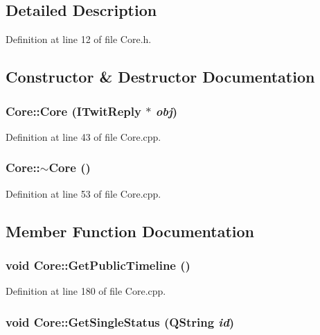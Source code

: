 \subsection{Detailed Description}


Definition at line 12 of file Core.h.

\subsection{Constructor \& Destructor Documentation}
\hypertarget{classCore_4d99e39664e6f9a1b885742f92d83ade}{
\subsubsection{\setlength{\rightskip}{0pt plus 5cm}Core::Core ({\bf ITwitReply} $\ast$ {\em obj})}}
\label{classCore_4d99e39664e6f9a1b885742f92d83ade}




Definition at line 43 of file Core.cpp.\hypertarget{classCore_776f8c46504b14183883c6273f93eaed}{
\subsubsection{\setlength{\rightskip}{0pt plus 5cm}Core::$\sim$Core ()}}
\label{classCore_776f8c46504b14183883c6273f93eaed}




Definition at line 53 of file Core.cpp.

\subsection{Member Function Documentation}
\hypertarget{classCore_e07b32f495c64e768eb74cf50585352c}{
\subsubsection{\setlength{\rightskip}{0pt plus 5cm}void Core::GetPublicTimeline ()}}
\label{classCore_e07b32f495c64e768eb74cf50585352c}




Definition at line 180 of file Core.cpp.\hypertarget{classCore_88d775139d0168f3fa24b4b4fda83386}{
\subsubsection{\setlength{\rightskip}{0pt plus 5cm}void Core::GetSingleStatus (QString {\em id})}}
\label{classCore_88d775139d0168f3fa24b4b4fda83386}




